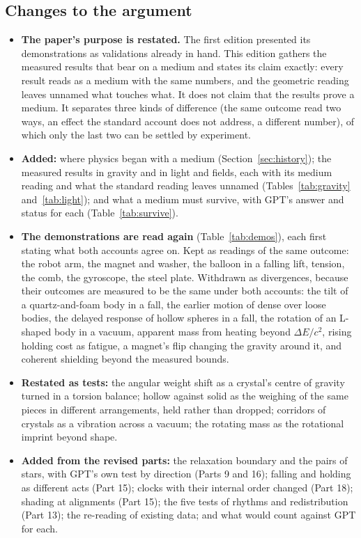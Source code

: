 \subsection*{Changes to the argument}
\begin{itemize}
\item \textbf{The paper's purpose is restated.} The first edition presented its demonstrations as validations already in hand. This edition gathers the measured results that bear on a medium and states its claim exactly: every result reads as a medium with the same numbers, and the geometric reading leaves unnamed what touches what. It does not claim that the results prove a medium. It separates three kinds of difference (the same outcome read two ways, an effect the standard account does not address, a different number), of which only the last two can be settled by experiment.
\item \textbf{Added:} where physics began with a medium (Section~\ref{sec:history}); the measured results in gravity and in light and fields, each with its medium reading and what the standard reading leaves unnamed (Tables~\ref{tab:gravity} and~\ref{tab:light}); and what a medium must survive, with GPT's answer and status for each (Table~\ref{tab:survive}).
\item \textbf{The demonstrations are read again} (Table~\ref{tab:demos}), each first stating what both accounts agree on. Kept as readings of the same outcome: the robot arm, the magnet and washer, the balloon in a falling lift, tension, the comb, the gyroscope, the steel plate. Withdrawn as divergences, because their outcomes are measured to be the same under both accounts: the tilt of a quartz-and-foam body in a fall, the earlier motion of dense over loose bodies, the delayed response of hollow spheres in a fall, the rotation of an L-shaped body in a vacuum, apparent mass from heating beyond $\Delta E/c^2$, rising holding cost as fatigue, a magnet's flip changing the gravity around it, and coherent shielding beyond the measured bounds.
\item \textbf{Restated as tests:} the angular weight shift as a crystal's centre of gravity turned in a torsion balance; hollow against solid as the weighing of the same pieces in different arrangements, held rather than dropped; corridors of crystals as a vibration across a vacuum; the rotating mass as the rotational imprint beyond shape.
\item \textbf{Added from the revised parts:} the relaxation boundary and the pairs of stars, with GPT's own test by direction (Parts 9 and 16); falling and holding as different acts (Part 15); clocks with their internal order changed (Part 18); shading at alignments (Part 15); the five tests of rhythms and redistribution (Part 13); the re-reading of existing data; and what would count against GPT for each.
\end{itemize}

